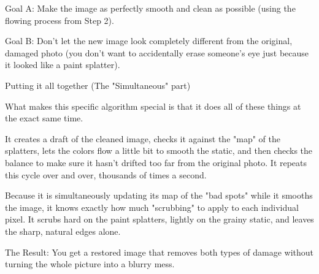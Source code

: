     Goal A: Make the image as perfectly smooth and clean as possible (using the flowing process from Step 2).

    Goal B: Don't let the new image look completely different from the original, damaged photo (you don't want to accidentally erase someone's eye just because it looked like a paint splatter).

Putting it all together (The "Simultaneous" part)

What makes this specific algorithm special is that it does all of these things at the exact same time.

It creates a draft of the cleaned image, checks it against the "map" of the splatters, lets the colors flow a little bit to smooth the static, and then checks the balance to make sure it hasn't drifted too far from the original photo. It repeats this cycle over and over, thousands of times a second.

Because it is simultaneously updating its map of the "bad spots" while it smooths the image, it knows exactly how much "scrubbing" to apply to each individual pixel. It scrubs hard on the paint splatters, lightly on the grainy static, and leaves the sharp, natural edges alone.

The Result: You get a restored image that removes both types of damage without turning the whole picture into a blurry mess.


